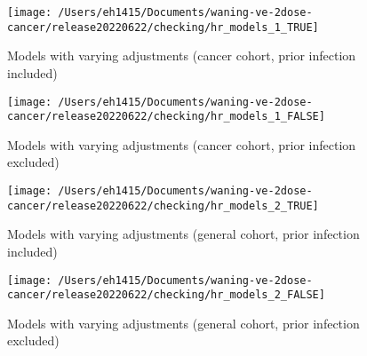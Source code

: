 \documentclass[
  10,
]{article}
\author{}
\date{\vspace{-2.5em}}
\begin{document}
\tableofcontents

\listoftables

\listoffigures

\begin{landscape}

\begin{figure}[H]

{\centering \texttt{[image: /Users/eh1415/Documents/waning-ve-2dose-cancer/release20220622/checking/hr\_models\_1\_TRUE]} 

}

\caption{Models with varying adjustments (cancer cohort, prior infection included)}\label{fig:unnamed-chunk-2}
\end{figure}

\begin{figure}[H]

{\centering \texttt{[image: /Users/eh1415/Documents/waning-ve-2dose-cancer/release20220622/checking/hr\_models\_1\_FALSE]} 

}

\caption{Models with varying adjustments (cancer cohort, prior infection excluded)}\label{fig:unnamed-chunk-3}
\end{figure}

\begin{figure}[H]

{\centering \texttt{[image: /Users/eh1415/Documents/waning-ve-2dose-cancer/release20220622/checking/hr\_models\_2\_TRUE]} 

}

\caption{Models with varying adjustments (general cohort, prior infection included)}\label{fig:unnamed-chunk-4}
\end{figure}

\begin{figure}[H]

{\centering \texttt{[image: /Users/eh1415/Documents/waning-ve-2dose-cancer/release20220622/checking/hr\_models\_2\_FALSE]} 

}

\caption{Models with varying adjustments (general cohort, prior infection excluded)}\label{fig:unnamed-chunk-5}
\end{figure}

\begin{figure}[H]


\end{figure}
\end{landscape}
\end{document}
